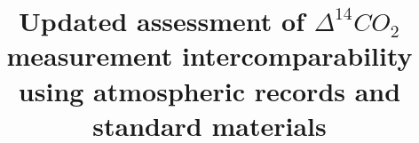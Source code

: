 \documentclass{article}
\title{Updated assessment of ${\Delta^{14}CO_{2}}$ measurement intercomparability using atmospheric records and standard materials}
\begin{document}
\maketitle

\cite{suess1955radiocarbon}
\cite{broecker1985distribution}
\cite{kanu2016measurements}
\cite{kjellstrom2000transport}
\cite{miller2013}
\cite{lehman2013allocation}

\newpage


\end{document}
